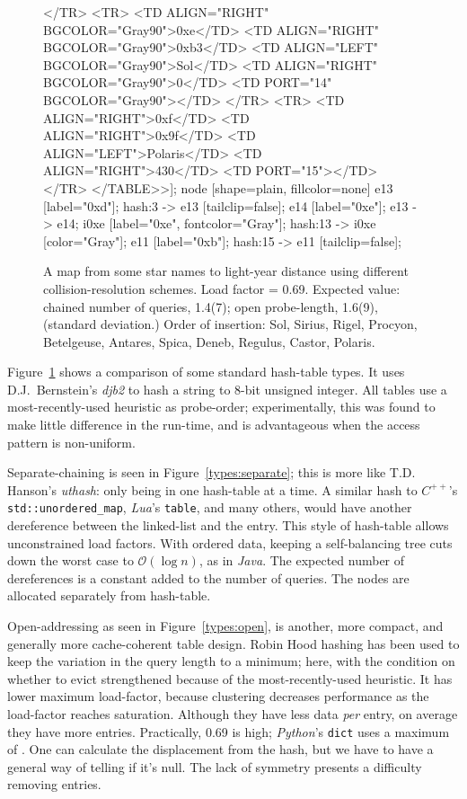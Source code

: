 \documentclass[12pt]{article}
\newcommand{\code}[1]{\colorbox{light-gray}{\texttt{#1}}}
\begin{document}
\begin{figure}
{{	</TR>
	<TR>
		<TD ALIGN="RIGHT" BGCOLOR="Gray90">0xe</TD>
		<TD ALIGN="RIGHT" BGCOLOR="Gray90">0xb3</TD>
		<TD ALIGN="LEFT" BGCOLOR="Gray90">Sol</TD>
		<TD ALIGN="RIGHT" BGCOLOR="Gray90">0</TD>
		<TD PORT="14" BGCOLOR="Gray90">
	</TR>
	<TR>
		<TD ALIGN="RIGHT">0xf</TD>
		<TD ALIGN="RIGHT">0x9f</TD>
		<TD ALIGN="LEFT">Polaris</TD>
		<TD ALIGN="RIGHT">430</TD>
		<TD PORT="15">
	</TR>
</TABLE>>];
	node [shape=plain, fillcolor=none]
	e13 [label="0xd"];
	hash:3 -> e13 [tailclip=false];
	e14 [label="0xe"];
	e13 -> e14;
	i0xe [label="0xe", fontcolor="Gray"];
	hash:13 -> i0xe [color="Gray"];
	e11 [label="0xb"];
	hash:15 -> e11 [tailclip=false];
		}
	}
	\caption{A map from some star names to light-year distance using different collision-resolution schemes. Load factor  = 0.69. Expected value: chained number of queries, 1.4(7);
open probe-length, 1.6(9),
(standard deviation.)\label{types}
Order of insertion: Sol, Sirius, Rigel, Procyon, Betelgeuse, Antares, Spica, Deneb, Regulus, Castor, Polaris.}
\end{figure}

Figure~\ref{types} shows a comparison of some standard hash-table types. It uses D.J.~Bernstein's {\it djb2} to hash a string to 8-bit unsigned integer. All tables use a most-recently-used heuristic as probe-order; experimentally, this was found to make little difference in the run-time, and is advantageous when the access pattern is non-uniform\cite{brent1973reducing, sleator1985self}.

Separate-chaining is seen in Figure~\ref{types:separate}; this is more like T.D. Hanson's {\it uthash}: only being in one hash-table at a time. A similar hash to {\it $C^{++}$}'s \code{std::unordered\_map}, {\it Lua}'s \code{table}, and many others, would have another dereference between the linked-list and the entry. This style of hash-table allows unconstrained load factors. With ordered data, keeping a self-balancing tree cuts down the worst case to $\mathcal{O}(\log n)$\cite{knuth1998sorting}, as in {\it Java}. The expected number of dereferences is a constant added to the number of queries. The nodes are allocated separately from hash-table.

Open-addressing\cite{peterson1957addressing} as seen in Figure~\ref{types:open}, is another, more compact, and generally more cache-coherent table design. Robin Hood hashing\cite{celis1985robin} has been used to keep the variation in the query length to a minimum; here, with the condition on whether to evict strengthened because of the most-recently-used heuristic. It has lower maximum load-factor, because clustering decreases performance as the load-factor reaches saturation.\cite{skiena2008algorithm} Although they have less data {\it per} entry, on average they have more entries. Practically, 0.69 is high; {\it Python}'s \code{dict}\cite{knuth1998sorting} uses a maximum of . One can calculate the displacement from the hash, but we have to have a general way of telling if it's null. The lack of symmetry presents a difficulty removing entries.
\end{document}
